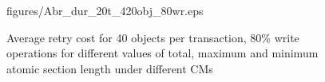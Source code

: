 \documentclass[12pt,english]{report}
\begin{document}
\begin{figure}
{{figures/Abr_dur_20t_420obj_80wr.eps}
\label{fig:20t_ecm_rcm_lcm_pnf_420obj_80wr}
}
\caption{Average retry cost for 40 objects per transaction, 80\% write operations for different values of total, maximum and minimum atomic section length under different CMs}
\label{fig:cm_40obj_per_tx_80wr}
\end{figure}
\begin{figure}
\centering

~
~
\subfigure[20 tasks]{
}
\end{figure}
\end{document}
